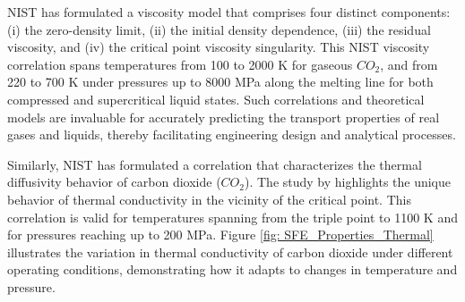 \documentclass[../Article_Model_Parameters.tex]{subfiles}
\begin{document}
	NIST has formulated a viscosity model that comprises four distinct components: (i) the zero-density limit, (ii) the initial density dependence, (iii) the residual viscosity, and (iv) the critical point viscosity singularity. This NIST viscosity correlation spans temperatures from 100 to 2000 K for gaseous $CO_2$, and from 220 to 700 K under pressures up to 8000 MPa along the melting line for both compressed and supercritical liquid states. Such correlations and theoretical models are invaluable for accurately predicting the transport properties of real gases and liquids, thereby facilitating engineering design and analytical processes.
	
	
	Similarly, NIST has formulated a correlation that characterizes the thermal diffusivity behavior of carbon dioxide ($CO_2$). The study by \citet{Huber2016} highlights the unique behavior of thermal conductivity in the vicinity of the critical point. This correlation is valid for temperatures spanning from the triple point to 1100 K and for pressures reaching up to 200 MPa. Figure \ref{fig: SFE_Properties_Thermal} illustrates the variation in thermal conductivity of carbon dioxide under different operating conditions, demonstrating how it adapts to changes in temperature and pressure.
	
	
\end{document}
